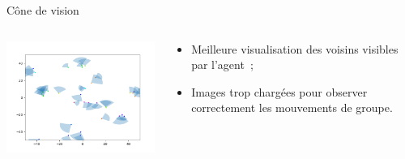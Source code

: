 \documentclass[aspectratio=43, a4paper, 12pt]{beamer}
\begin{document}
\begin{frame}{Cône de vision}
\begin{columns}
			\begin{column}{0.6\paperwidth}
		       \begin{center}\includegraphics[width=8cm]{images/image_12.png}\end{center}
			\end{column}
			
			\begin{column}{0.4\paperwidth}
				\begin{itemize}
					\item<1-> Meilleure visualisation des voisins visibles par l'agent~;
					\item<2-> Images trop chargées pour observer correctement les mouvements de groupe.
				\end{itemize}			
			\end{column}
		\end{columns}		
	\end{frame}
\end{document}
